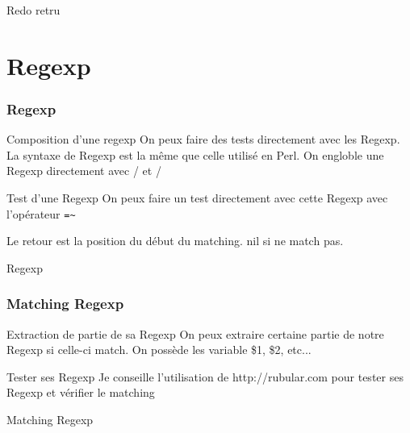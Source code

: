\documentclass{beamer}
\begin{document}
\begin{frame}
  \begin{block}{Redo retru}
    
  \end{block}
\end{frame}

\section{Regexp}

\begin{frame}
  \frametitle{Regexp}
  \begin{block}{Composition d'une regexp}
    On peux faire des tests directement avec les Regexp. La syntaxe de Regexp est la même que celle
    utilis\'e en Perl. On engloble une Regexp directement avec / et /
  \end{block}
  \begin{block}{Test d'une Regexp}
    On peux faire un test directement avec cette Regexp avec l'op\'erateur \verb?=~?

    Le retour est la position du d\'ebut du matching. nil si ne match pas.
  \end{block}
\end{frame}

\begin{frame}
  \begin{block}{Regexp}
    
  \end{block}
\end{frame}

\begin{frame}
  \frametitle{Matching Regexp}
  \begin{block}{Extraction de partie de sa Regexp}
    On peux extraire certaine partie de notre Regexp si celle-ci match. On possède les
    variable \$1, \$2, etc...
  \end{block}

  \begin{block}{Tester ses Regexp}
    Je conseille l'utilisation de http://rubular.com pour tester ses Regexp et
    v\'erifier le matching
  \end{block}
\end{frame}

\begin{frame}
  \begin{block}{Matching Regexp}
    
  \end{block}
\end{frame}
\end{document}
